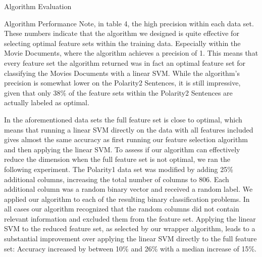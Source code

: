 \documentclass{llncs}
\begin{document}
\begin{section}{Algorithm Evaluation}
\begin{subsection}{Algorithm Performance}
Note, in table 4, the high precision within each data set. These numbers indicate that the algorithm we designed is quite effective for selecting optimal feature sets within the training data. Especially within the Movie Documents, where the algorithm achieves a precision of 1. This means that every feature set the algorithm returned was in fact an optimal feature set for classifying the Movies Documents with a linear SVM. While the algorithm's precision is somewhat lower on the Polarity2 Sentences, it is still impressive, given that only 38\% of the feature sets within the Polarity2 Sentences are actually labeled as optimal.

In the aforementioned data sets the full feature set is close to optimal, which means that running a linear SVM directly on the data with all features included gives almost the same accuracy as first running our feature selection algorithm and then applying the linear SVM. To assess if our algorithm can effectively reduce the dimension when the full feature set is not optimal, we ran the following experiment. The Polarity1 data set was modified by adding 25\% additional columns, increasing the total number of columns to 806. Each additional column was a random binary vector and received a random label. We applied our algorithm to each of the resulting binary classification problems. In all cases our algorithm recognized that the random columns did not contain relevant information and excluded them from the feature set. Applying the linear SVM to the reduced feature set, as selected by our wrapper algorithm, leads to a substantial improvement over applying the linear SVM directly to the full feature set: Accuracy increased by between 10\% and 26\% with a median increase of 15\%.


\end{subsection}
\end{section}
\end{document}
